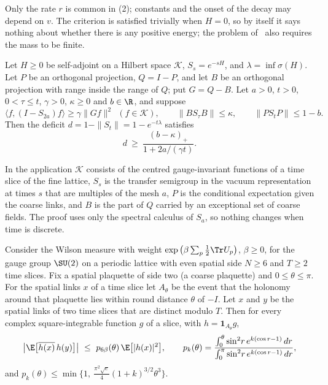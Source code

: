 Only the rate $r$ is common in (2); constants and the onset of the decay may depend on $v$. The criterion is
satisfied trivially when $H=0$, so by itself it says nothing about whether there is any positive energy; the
problem of~\cite{JW} also requires the mass to be finite.

\begin{theorem}\label{t:inh}
Let $H\ge0$ be self-adjoint on a Hilbert space $\mathcal K$, $S_s=e^{-sH}$, and $\lambda=\inf\sigma(H)$. Let
$P$ be an orthogonal projection, $Q=I-P$, and let $B$ be an orthogonal projection with range inside the range
of $Q$; put $G=Q-B$. Let $a>0$, $t>0$, $0<\tau\le t$, $\gamma>0$, $\kappa\ge0$ and $b\in\R$, and suppose
\begin{equation}\label{e:hyp}
\langle f,(I-S_{2a})f\rangle\ge\gamma\|Gf\|^2\ \ (f\in\mathcal K),\qquad
\|BS_\tau B\|\le\kappa,\qquad \|PS_tP\|\le1-b .
\end{equation}
Then the deficit $d=1-\|S_t\|=1-e^{-t\lambda}$ satisfies
\begin{equation}\label{e:inh}
d\ \ge\ \frac{(b-\kappa)_+}{1+2a/(\gamma t)} .
\end{equation}
\end{theorem}

In the application $\mathcal K$ consists of the centred gauge-invariant functions of a time slice of the
fine lattice, $S_s$
is the transfer semigroup in the vacuum representation at times $s$ that are multiples of the mesh $a$, $P$
is the conditional expectation given the coarse links, and $B$ is the part of $Q$ carried by an exceptional
set of coarse fields. The proof uses only the spectral calculus of $S_a$, so nothing changes when time is
discrete.

\begin{theorem}\label{t:ret}
Consider the Wilson measure with weight $\exp\big(\beta\sum_p\tfrac12\Tr U_p\big)$, $\beta\ge0$, for the gauge
group $\SU(2)$ on a periodic lattice with even spatial side $N\ge6$ and $T\ge2$ time slices. Fix a spatial
plaquette of side two (a coarse plaquette) and $0\le\theta\le\pi$. For the spatial links $x$ of a time slice
let $A_\theta$ be the event that the holonomy around that plaquette lies within round distance $\theta$ of
$-I$. Let $x$ and $y$ be the spatial links of two time slices that are distinct modulo $T$. Then for every
complex square-integrable function $g$ of a slice, with $h=\mathbf 1_{A_\theta}g$,
\begin{equation}\label{e:ret}
\big|\E\big[\overline{h(x)}\,h(y)\big]\big|\ \le\ p_{6\beta}(\theta)\,\E\big[|h(x)|^2\big],
\qquad
p_k(\theta)=\frac{\int_0^\theta\sin^2\!r\,e^{k(\cos r-1)}\,dr}{\int_0^\pi\sin^2\!r\,e^{k(\cos r-1)}\,dr},
\end{equation}
and $p_k(\theta)\le\min\{1,\ \tfrac{\pi^2\sqrt e}{4}(1+k)^{3/2}\theta^3\}$.
\end{theorem}

